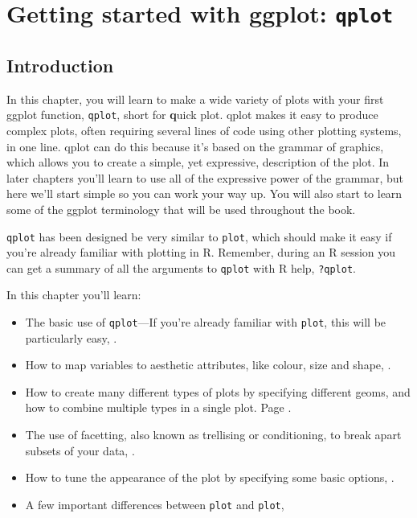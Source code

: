 

% 

%


\chapter{Getting started with ggplot: {\tt qplot}}
\label{cha:qplot}

\section{Introduction} 

In this chapter, you will learn to make a wide variety of plots with your first ggplot function, {\tt qplot}, short for {\bf q}uick plot. qplot makes it easy to produce complex plots, often requiring several lines of code using other plotting systems, in one line. qplot can do this because it's based on the grammar of graphics, which allows you to create a simple, yet expressive, description of the plot.  In later chapters you'll learn to use all of the expressive power of the grammar, but here we'll start simple so you can work your way up.  You will also start to learn some of the ggplot terminology that will be used throughout the book.

{\tt qplot} has been designed be very similar to {\tt plot}, which should make it easy if you're already familiar with plotting in R.  Remember, during an R session you can get a summary of all the arguments to {\tt qplot} with R help, {\tt ?qplot}.

In this chapter you'll learn:

\begin{itemize}
  \item The basic use of {\tt qplot}---If you're already familiar with {\tt plot}, this will be particularly easy, .
  \item How to map variables to aesthetic attributes, like colour, size and shape, .
  \item How to create many different types of plots by specifying different geoms, and how to combine multiple types in a single plot. Page .
  \item The use of facetting, also known as trellising or conditioning, to break apart subsets of your data, .
  \item How to tune the appearance of the plot by specifying some basic options, .
  \item A few important differences between {\tt plot} and {\tt plot}, 
\end{itemize}

